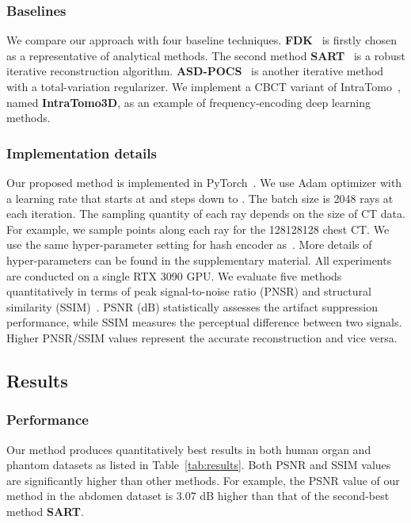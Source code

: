 \documentclass[runningheads]{llncs}
\begin{document}
\subsubsection{Baselines}
We compare our approach with four baseline techniques. \textbf{FDK}~\cite{feldkamp1984practical} is firstly chosen as a representative of analytical methods. The second method \textbf{SART}~\cite{andersen1984simultaneous} is a robust iterative reconstruction algorithm. \textbf{ASD-POCS}~\cite{sidky2008image} is another iterative method with a total-variation regularizer. We implement a CBCT variant of IntraTomo~\cite{zang2021intratomo}, named  \textbf{IntraTomo3D}, as an example of frequency-encoding deep learning methods.

\subsubsection{Implementation details}
Our proposed method is implemented in PyTorch~\cite{NEURIPS2019_9015}. We use Adam optimizer with a learning rate that starts at  and steps down to . The batch size is 2048 rays at each iteration. The sampling quantity of each ray depends on the size of CT data. For example, we sample  points along each ray for the 128128128 chest CT. We use the same hyper-parameter setting for hash encoder as~\cite{mueller2022instant}. More details of hyper-parameters can be found in the supplementary material. All experiments are conducted on a single RTX 3090 GPU. We evaluate five methods quantitatively in terms of peak signal-to-noise ratio (PNSR) and structural similarity (SSIM)~\cite{wang2004image}. PSNR (dB) statistically assesses the artifact suppression performance, while SSIM measures the perceptual difference between two signals. Higher PNSR/SSIM values represent the accurate reconstruction and vice versa.

\subsection{Results}
\subsubsection{Performance} 
Our method produces quantitatively best results in both human organ and phantom datasets as listed in Table~\ref{tab:results}. Both PSNR and SSIM values are significantly higher than other methods. For example, the PSNR value of our method in the abdomen dataset is 3.07 dB higher than that of the second-best method \textbf{SART}. 
\end{document}
